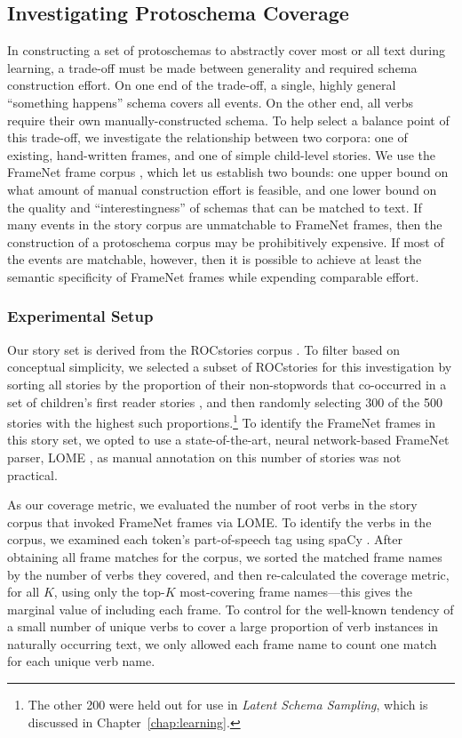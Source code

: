 \subsection{Investigating Protoschema Coverage}
In constructing a set of protoschemas to abstractly cover most or all text during learning, a trade-off must be made between generality and required schema construction effort. On one end of the trade-off, a single, highly general ``something happens'' schema covers all events. On the other end, all verbs require their own manually-constructed schema. To help select a balance point of this trade-off, we investigate the relationship between two corpora: one of existing, hand-written frames, and one of simple child-level stories. We use the FrameNet frame corpus \citep{framenet}, which let us establish two bounds: one upper bound on what amount of manual construction effort is feasible, and one lower bound on the quality and ``interestingness'' of schemas that can be matched to text.
If many events in the story corpus are unmatchable to FrameNet frames, then the construction of a protoschema corpus may be prohibitively expensive. If most of the events are matchable, however, then it is possible to achieve at least the semantic specificity of FrameNet frames while expending comparable effort.

\subsubsection{Experimental Setup}
Our story set is derived from the ROCstories corpus \citep{mostafazadeh-etal-2016-corpus}. To filter based on conceptual simplicity, we selected a subset of ROCstories for this investigation by sorting all stories by the proportion of their non-stopwords that co-occurred in a set of children's first reader stories \citep{mcguffey}, and then randomly selecting 300 of the 500 stories with the highest such proportions.\footnote{The other 200 were held out for use in \textit{Latent Schema Sampling}, which is discussed in Chapter~\ref{chap:learning}.} To identify the FrameNet frames in this story set, we opted to use a state-of-the-art, neural network-based FrameNet parser, LOME \citep{lome}, as manual annotation on this number of stories was not practical.

As our coverage metric, we evaluated the number of root verbs in the story corpus that invoked FrameNet frames via LOME. To identify the verbs in the corpus, we examined each token's part-of-speech tag using spaCy \citep{spacy2}. After obtaining all frame matches for the corpus, we sorted the matched frame names by the number of verbs they covered, and then re-calculated the coverage metric, for all $K$, using only the top-$K$ most-covering frame names---this gives the marginal value of including each frame. To control for the well-known tendency of a small number of unique verbs to cover a large proportion of verb instances in naturally occurring text, we only allowed each frame name to count one match for each unique verb name.

